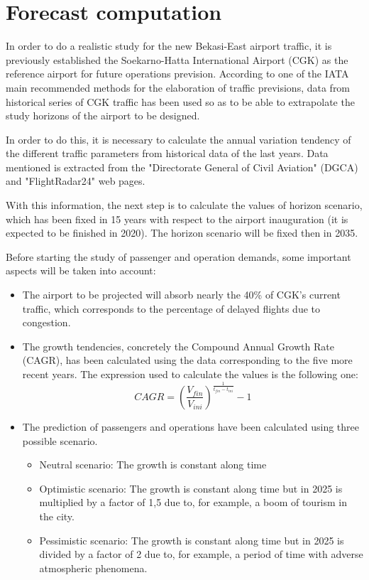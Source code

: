 \section{Forecast computation}
In order to do a realistic study for the new Bekasi-East airport traffic, it is previously established the Soekarno-Hatta International Airport (CGK) as the reference airport for future operations prevision. According to one of the IATA main recommended methods for the elaboration of traffic previsions, data from historical series of CGK traffic has been used so as to be able to extrapolate the study horizons of the airport to be designed.

In order to do this, it is necessary to calculate the annual variation tendency of the different traffic parameters from historical data of the last years. Data mentioned is extracted from the "Directorate General of Civil Aviation" (DGCA) and "FlightRadar24" web pages.

With this information, the next step is to calculate the values of horizon scenario, which has been fixed in 15 years with respect to the airport inauguration (it is expected to be finished in 2020). The horizon scenario will be fixed then in 2035.  

Before starting the study of passenger and operation demands, some important aspects will be taken into account:

\begin{itemize}
	\item The airport to be projected will absorb nearly the 40\% of CGK’s current traffic, which corresponds to the percentage of delayed flights due to congestion.
	\item The growth tendencies, concretely the Compound Annual Growth Rate (CAGR), has been calculated using the data corresponding to the five more recent years. The expression used to calculate the values is the following one:
	\begin{equation}
	CAGR=\left(\frac{V_{fin}}{V_{ini}}\right)^{\frac{1}{t_{fin}-t_{ini}}}-1
	\end{equation}
	\item The prediction of passengers and operations have been calculated using three possible scenario.
	\begin{itemize}
		\item Neutral scenario: The growth is constant along time
		\item Optimistic scenario: The growth is constant along time but in 2025 is multiplied by a factor of 1,5 due to, for example, a boom of tourism in the city.
		\item Pessimistic scenario: The growth is constant along time but in 2025 is divided by a factor of 2 due to, for example, a period of time with adverse atmospheric phenomena.
	\end{itemize}
\end{itemize}

